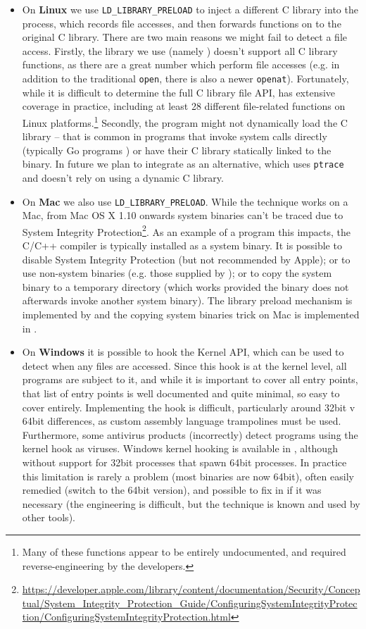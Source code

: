 \begin{itemize}
\item On \textbf{Linux} we use \texttt{LD\_LIBRARY\_PRELOAD} to inject a different C library into the process, which records file accesses, and then forwards functions on to the original C library. There are two main reasons we might fail to detect a file access. Firstly, the library we use (namely \Fsatrace) doesn't support all C library functions, as there are a great number which perform file accesses (e.g. in addition to the traditional \texttt{open}, there is also a newer \texttt{openat}). Fortunately, while it is difficult to determine the full C library file API, \Fsatrace has extensive coverage in practice, including at least 28 different file-related functions on Linux platforms.\footnote{Many of these functions appear to be entirely undocumented, and required reverse-engineering by the \Fsatrace developers.} Secondly, the program might not dynamically load the C library -- that is common in programs that invoke system calls directly (typically Go programs \cite{go}) or have their C library statically linked to the binary. In future we plan to integrate \Bigbro \cite{bigbro} as an alternative, which uses \texttt{ptrace} and doesn't rely on using a dynamic C library.
\item On \textbf{Mac} we also use \texttt{LD\_LIBRARY\_PRELOAD}. While the technique works on a Mac, from Mac OS X 1.10 onwards system binaries can't be traced due to System Integrity Protection\footnote{\url{https://developer.apple.com/library/content/documentation/Security/Conceptual/System_Integrity_Protection_Guide/ConfiguringSystemIntegrityProtection/ConfiguringSystemIntegrityProtection.html}}. As an example of a program this impacts, the C/C++ compiler is typically installed as a system binary. It is possible to disable System Integrity Protection (but not recommended by Apple); or to use non-system binaries (e.g. those supplied by \Nix \cite{nix}); or to copy the system binary to a temporary directory (which works provided the binary does not afterwards invoke another system binary). The library preload mechanism is implemented by \Fsatrace and the copying system binaries trick on Mac is implemented in \Shake.
\item On \textbf{Windows} it is possible to hook the Kernel API, which can be used to detect when any files are accessed. Since this hook is at the kernel level, all programs are subject to it, and while it is important to cover all entry points, that list of entry points is well documented and quite minimal, so easy to cover entirely. Implementing the hook is difficult, particularly around 32bit v 64bit differences, as custom assembly language trampolines must be used. Furthermore, some antivirus products (incorrectly) detect programs using the kernel hook as viruses. Windows kernel hooking is available in  \Fsatrace, although without support for 32bit processes that spawn 64bit processes. In practice this limitation is rarely a problem (most binaries are now 64bit), often easily remedied (switch to the 64bit version), and possible to fix in \Fsatrace if it was necessary (the engineering is difficult, but the technique is known and used by other tools).

\end{itemize}
